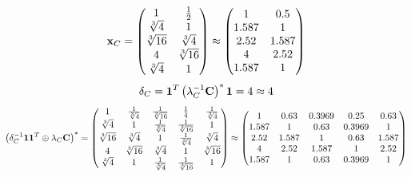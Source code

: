\documentclass[10pt,a4paper]{article}
\begin{document}
	\[
		\bold{x}_{C} = 
		\begin{pmatrix}
			{1} {} & \frac{1} {{2}} \\
			{\sqrt[3]{4}} {} & {1} {} \\
			{\sqrt[3]{16}} {} & {\sqrt[3]{4}} {} \\
			{{4}} {} & {\sqrt[3]{16}} {} \\
			{\sqrt[3]{4}} {} & {1} {} \\
		\end{pmatrix}
		\approx
		\begin{pmatrix}
			1        & 0.5      \\
			1.587    & 1        \\
			2.52     & 1.587    \\
			4        & 2.52     \\
			1.587    & 1        \\
		\end{pmatrix}
	\]
	\[
		\delta_{C} = \bold{1}^T \left(\lambda_{C}^{-1}\bold{C}\right)^* \bold{1} = {{4}} {}\approx 4
	\]
	\[
		\left(\delta_{C}^{-1}\bold{11}^T \oplus \lambda_{C}\bold{C}\right)^* = 
		\begin{pmatrix}
			{1} {} & \frac{1} {\sqrt[3]{4}} & \frac{1} {\sqrt[3]{16}} & \frac{1} {{4}} & \frac{1} {\sqrt[3]{4}} \\
			{\sqrt[3]{4}} {} & {1} {} & \frac{1} {\sqrt[3]{4}} & \frac{1} {\sqrt[3]{16}} & {1} {} \\
			{\sqrt[3]{16}} {} & {\sqrt[3]{4}} {} & {1} {} & \frac{1} {\sqrt[3]{4}} & {\sqrt[3]{4}} {} \\
			{{4}} {} & {\sqrt[3]{16}} {} & {\sqrt[3]{4}} {} & {1} {} & {\sqrt[3]{16}} {} \\
			{\sqrt[3]{4}} {} & {1} {} & \frac{1} {\sqrt[3]{4}} & \frac{1} {\sqrt[3]{16}} & {1} {} \\
		\end{pmatrix}
		\approx
		\begin{pmatrix}
			1        & 0.63     & 0.3969   & 0.25     & 0.63     \\
			1.587    & 1        & 0.63     & 0.3969   & 1        \\
			2.52     & 1.587    & 1        & 0.63     & 1.587    \\
			4        & 2.52     & 1.587    & 1        & 2.52     \\
			1.587    & 1        & 0.63     & 0.3969   & 1        \\
		\end{pmatrix}
	\]
\end{document}
